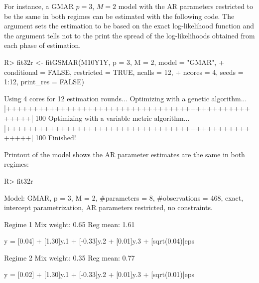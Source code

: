 \documentclass[nojss]{jss} %
\begin{document}
For instance, a GMAR $p=3$, $M=2$ model with the AR parameters restricted to be the same in both regimes can be estimated with the following code. The argument  sets the estimation to be based on the exact log-likelihood function and the argument  tells  not to the print the spread of the log-likelihoods obtained from each phase of estimation.
%
\begin{CodeChunk}
\begin{CodeInput}
R> fit32r <- fitGSMAR(M10Y1Y, p = 3, M = 2, model = "GMAR",
+    conditional = FALSE, restricted = TRUE, ncalls = 12,
+    ncores = 4, seeds = 1:12, print_res = FALSE)
\end{CodeInput}
\begin{CodeOutput}
Using 4 cores for 12 estimation rounds...
Optimizing with a genetic algorithm...
  |++++++++++++++++++++++++++++++++++++++++++++++++++| 100%
Optimizing with a variable metric algorithm...
  |++++++++++++++++++++++++++++++++++++++++++++++++++| 100%
Finished!
\end{CodeOutput}
\end{CodeChunk}
%
Printout of the model shows the AR parameter estimates are the same in both regimes:
%
\begin{CodeChunk}
\begin{CodeInput}
R> fit32r
\end{CodeInput}
\begin{CodeOutput}
Model:
 GMAR, p = 3, M = 2, #parameters = 8, #observations = 468,
 exact, intercept parametrization, AR parameters restricted, no constraints.

Regime 1
Mix weight: 0.65
Reg mean: 1.61

y = [0.04] + [1.30]y.1 + [-0.33]y.2 + [0.01]y.3 + [sqrt(0.04)]eps

Regime 2
Mix weight: 0.35
Reg mean: 0.77

y = [0.02] + [1.30]y.1 + [-0.33]y.2 + [0.01]y.3 + [sqrt(0.01)]eps
\end{CodeOutput}
\end{CodeChunk}
%
\end{document}
